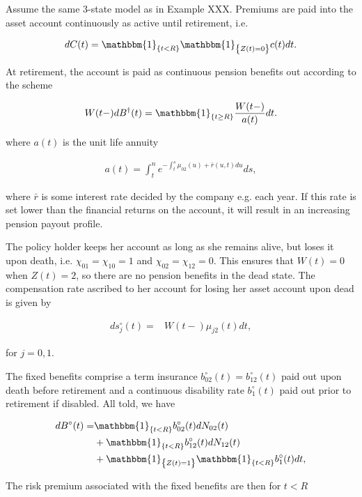 \documentclass{book}
\newcommand{\1}[1]{\mathbbm{1}_{\left\lbrace #1 \right\rbrace}}
\theoremstyle{break}
\theoremstyle{remark}
\numberwithin{equation}{section}
\begin{document}
\begin{example} \label{ULExample}
Assume the same 3-state model as in Example XXX. Premiums are paid into the asset account continuously as active until retirement, i.e.

\begin{align*}
	dC(t) = \1{t<R} \1{Z(t)=0} c(t) dt.
\end{align*}

At retirement, the account is paid as continuous pension benefits out according to the scheme

\begin{align*}
W(t-) dB^{\dagger}(t) = \1{t \geq R} \frac{W(t-)}{a(t)} dt.
\end{align*}

where $a(t)$ is the unit life annuity 

\begin{align*}
a(t) = \int_t^n e^{-\int_t^s \mu_{02}(u) + \bar{r}(u,t) du}ds,
\end{align*}

where $\bar{r}$ is some interest rate decided by the company e.g. each year. If this rate is set lower than the financial returns on the account, it will result in an increasing pension payout profile.

The policy holder keeps her account as long as she remains alive, but loses it upon death, i.e. $\chi_{01}=\chi_{10}=1$ and $\chi_{02}=\chi_{12}=0$. This ensures that $W(t)=0$ when $Z(t)=2$, so there are no pension benefits in the dead state. The compensation rate ascribed to her account for losing her asset account upon dead is given by

\begin{align*}
ds_j^\circ(t) =& W(t-) \mu_{j2}(t) dt,
\end{align*}

for $j=0,1$.

The fixed benefits comprise a term insurance $b_{02}^\circ(t)=b_{12}^\circ(t)$ paid out upon death before retirement and a continuous disability rate $b_1^\circ(t)$ paid out prior to retirement if disabled. All told, we have

\begin{align*}
    dB^\circ(t) =& \1{t<R} b_{02}^\circ(t) dN_{02}(t) \\
    &+ \1{t<R} b_{12}^\circ(t) dN_{12}(t) \\
    &+ \1{Z(t)=1} \1{t<R} b_1^\circ(t)dt,
\end{align*}

The risk premium associated with the fixed benefits are then for $t<R$


\end{example}
\end{document}
